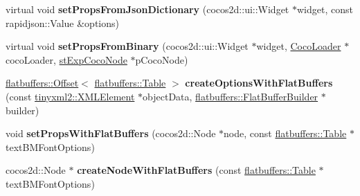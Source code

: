 \begin{DoxyCompactItemize}
virtual void {\bfseries set\+Props\+From\+Json\+Dictionary} (cocos2d\+::ui\+::\+Widget $\ast$widget, const rapidjson\+::\+Value \&options)
\item 
\mbox{\label{classcocostudio_1_1TextBMFontReader_ad371482f67304b33d24a6ff02dd7594e}} 
virtual void {\bfseries set\+Props\+From\+Binary} (cocos2d\+::ui\+::\+Widget $\ast$widget, \hyperlink{classcocostudio_1_1CocoLoader}{Coco\+Loader} $\ast$coco\+Loader, \hyperlink{structcocostudio_1_1stExpCocoNode}{st\+Exp\+Coco\+Node} $\ast$p\+Coco\+Node)
\item 
\mbox{\label{classcocostudio_1_1TextBMFontReader_a5f9c5c9159083a1c9a607a64a5063588}} 
\hyperlink{structflatbuffers_1_1Offset}{flatbuffers\+::\+Offset}$<$ \hyperlink{classflatbuffers_1_1Table}{flatbuffers\+::\+Table} $>$ {\bfseries create\+Options\+With\+Flat\+Buffers} (const \hyperlink{classtinyxml2_1_1XMLElement}{tinyxml2\+::\+X\+M\+L\+Element} $\ast$object\+Data, \hyperlink{classflatbuffers_1_1FlatBufferBuilder}{flatbuffers\+::\+Flat\+Buffer\+Builder} $\ast$builder)
\item 
\mbox{\label{classcocostudio_1_1TextBMFontReader_a85c86f5ac8d3aa9dba1d66faced29933}} 
void {\bfseries set\+Props\+With\+Flat\+Buffers} (cocos2d\+::\+Node $\ast$node, const \hyperlink{classflatbuffers_1_1Table}{flatbuffers\+::\+Table} $\ast$text\+B\+M\+Font\+Options)
\item 
\mbox{\label{classcocostudio_1_1TextBMFontReader_a7e2ea780cb6071c9e248f7b4e025e47a}} 
cocos2d\+::\+Node $\ast$ {\bfseries create\+Node\+With\+Flat\+Buffers} (const \hyperlink{classflatbuffers_1_1Table}{flatbuffers\+::\+Table} $\ast$text\+B\+M\+Font\+Options)
\end{DoxyCompactItemize}
